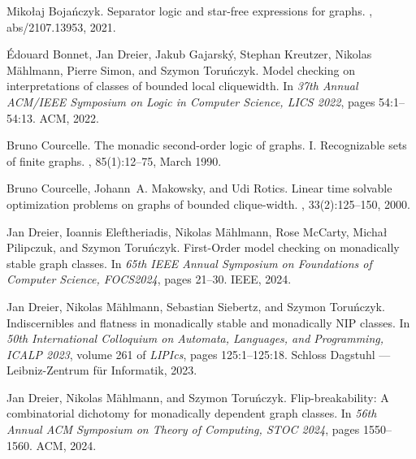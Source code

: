 \documentclass[11pt]{article}
\begin{document}








\begin{thebibliography}{10}

  Miko{\l}aj Boja\'nczyk.
  \newblock Separator logic and star-free expressions for graphs.
  , abs/2107.13953, 2021.
  
  {\'{E}}douard Bonnet, Jan Dreier, Jakub Gajarsk{\'{y}}, Stephan Kreutzer, Nikolas M{\"{a}}hlmann, Pierre Simon, and Szymon Toru\'nczyk.
  \newblock Model checking on interpretations of classes of bounded local cliquewidth.
  \newblock In {\em 37th Annual {ACM/IEEE} Symposium on Logic in Computer Science, {LICS} 2022}, pages 54:1--54:13. {ACM}, 2022.
  
  Bruno Courcelle.
  \newblock The monadic second-order logic of graphs. {{I}}. {{Recognizable}} sets of finite graphs.
  , 85(1):12--75, March 1990.
  
  Bruno Courcelle, Johann~A. Makowsky, and Udi Rotics.
  \newblock Linear time solvable optimization problems on graphs of bounded clique-width.
  , 33(2):125--150, 2000.
  
  Jan Dreier, Ioannis Eleftheriadis, Nikolas M{\"{a}}hlmann, Rose McCarty, {\relax Mi}cha\l{} Pilipczuk, and {\relax Sz}ymon Toru\'nczyk.
  \newblock First-{O}rder model checking on monadically stable graph classes.
  \newblock In {\em 65th {IEEE} Annual Symposium on Foundations of Computer Science, {FOCS}2024}, pages 21--30. {IEEE}, 2024.
  
  Jan Dreier, Nikolas M{\"{a}}hlmann, Sebastian Siebertz, and {\relax Sz}ymon Toru\'nczyk.
  \newblock Indiscernibles and flatness in monadically stable and monadically {NIP} classes.
  \newblock In {\em 50th International Colloquium on Automata, Languages, and Programming, {ICALP} 2023}, volume 261 of {\em LIPIcs}, pages 125:1--125:18. Schloss Dagstuhl --- Leibniz-Zentrum f{\"{u}}r Informatik, 2023.
  
  Jan Dreier, Nikolas M{\"{a}}hlmann, and {\relax Sz}ymon Toru\'nczyk.
  \newblock Flip-breakability: {A} combinatorial dichotomy for monadically dependent graph classes.
  \newblock In {\em 56th Annual {ACM} Symposium on Theory of Computing, {STOC} 2024}, pages 1550--1560. {ACM}, 2024.
  

\end{thebibliography}
\end{document}
